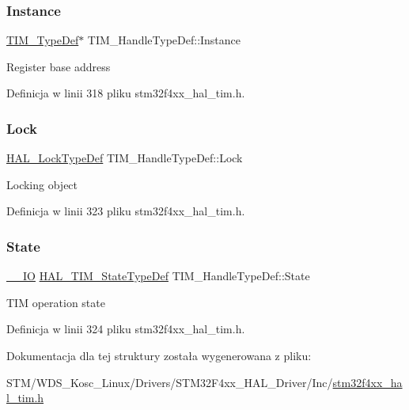\subsubsection{\texorpdfstring{Instance}{Instance}}
{\footnotesize\ttfamily \hyperlink{struct_t_i_m___type_def}{T\+I\+M\+\_\+\+Type\+Def}$\ast$ T\+I\+M\+\_\+\+Handle\+Type\+Def\+::\+Instance}

Register base address 

Definicja w linii 318 pliku stm32f4xx\+\_\+hal\+\_\+tim.\+h.

\mbox{\label{struct_t_i_m___handle_type_def_a2a24b963b57150ed2fb0f051cd87b65a}} 
\subsubsection{\texorpdfstring{Lock}{Lock}}
{\footnotesize\ttfamily \hyperlink{stm32f4xx__hal__def_8h_ab367482e943333a1299294eadaad284b}{H\+A\+L\+\_\+\+Lock\+Type\+Def} T\+I\+M\+\_\+\+Handle\+Type\+Def\+::\+Lock}

Locking object 

Definicja w linii 323 pliku stm32f4xx\+\_\+hal\+\_\+tim.\+h.

\mbox{\label{struct_t_i_m___handle_type_def_a6b6eeaf94f2e6e3d0a5bdac44adf21d6}} 
\subsubsection{\texorpdfstring{State}{State}}
{\footnotesize\ttfamily \hyperlink{core__sc300_8h_aec43007d9998a0a0e01faede4133d6be}{\+\_\+\+\_\+\+IO} \hyperlink{group___t_i_m___exported___types_gae0994cf5970e56ca4903e9151f40010c}{H\+A\+L\+\_\+\+T\+I\+M\+\_\+\+State\+Type\+Def} T\+I\+M\+\_\+\+Handle\+Type\+Def\+::\+State}

T\+IM operation state 

Definicja w linii 324 pliku stm32f4xx\+\_\+hal\+\_\+tim.\+h.



Dokumentacja dla tej struktury została wygenerowana z pliku\+:\begin{DoxyCompactItemize}
\item 
S\+T\+M/\+W\+D\+S\+\_\+\+Kosc\+\_\+\+Linux/\+Drivers/\+S\+T\+M32\+F4xx\+\_\+\+H\+A\+L\+\_\+\+Driver/\+Inc/\hyperlink{stm32f4xx__hal__tim_8h}{stm32f4xx\+\_\+hal\+\_\+tim.\+h}\end{DoxyCompactItemize}
